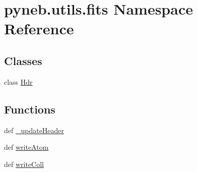 \hypertarget{namespacepyneb_1_1utils_1_1fits}{\section{pyneb.\-utils.\-fits Namespace Reference}
\label{namespacepyneb_1_1utils_1_1fits}
}
\subsection*{Classes}
\begin{DoxyCompactItemize}
\item 
class \hyperlink{classpyneb_1_1utils_1_1fits_1_1_hdr}{Hdr}
\end{DoxyCompactItemize}
\subsection*{Functions}
\begin{DoxyCompactItemize}
\item 
def \hyperlink{namespacepyneb_1_1utils_1_1fits_a40031d2d7de219b95d7475243b3888eb}{\-\_\-update\-Header}
\item 
def \hyperlink{namespacepyneb_1_1utils_1_1fits_a8055efc148e2aef26439d0a79a26549b}{write\-Atom}
\item 
def \hyperlink{namespacepyneb_1_1utils_1_1fits_a468ecdfaa21de61a1037128ee889fd76}{write\-Coll}
\end{DoxyCompactItemize}


